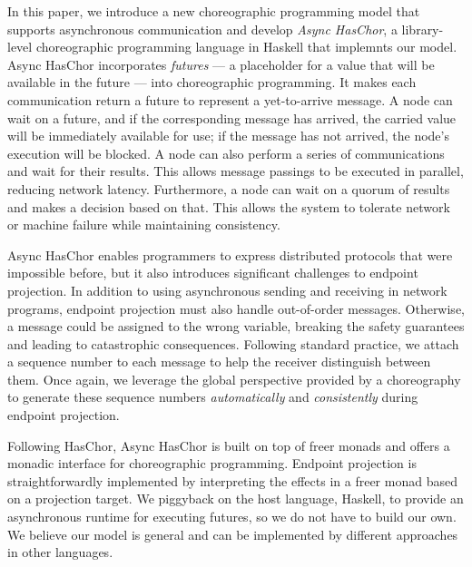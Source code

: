 In this paper, we introduce a new choreographic programming model that supports asynchronous communication and develop \emph{Async HasChor}, a library-level choreographic programming language in Haskell that implemnts our model.
%
Async HasChor incorporates \emph{futures} --- a placeholder for a value that will be available in the future --- into choreographic programming.
%
It makes each communication return a future to represent a yet-to-arrive message.
%
A node can wait on a future, and if the corresponding message has arrived, the carried value will be immediately available for use;
%
if the message has not arrived, the node's execution will be blocked.
%
A node can also perform a series of communications and wait for their results.
%
This allows message passings to be executed in parallel, reducing network latency.
%
Furthermore, a node can wait on a quorum of results and makes a decision based on that.
%
This allows the system to tolerate network or machine failure while maintaining consistency.

Async HasChor enables programmers to express distributed protocols that were impossible before, but it also introduces significant challenges to endpoint projection.
%
In addition to using asynchronous sending and receiving in network programs, endpoint projection must also handle out-of-order messages.
%
Otherwise, a message could be assigned to the wrong variable, breaking the safety guarantees and leading to catastrophic consequences.
%
Following standard practice, we attach a sequence number to each message to help the receiver distinguish between them.
%
Once again, we leverage the global perspective provided by a choreography to generate these sequence numbers \emph{automatically} and \emph{consistently} during endpoint projection.

Following HasChor, Async HasChor is built on top of freer monads and offers a monadic interface for choreographic programming.
%
Endpoint projection is straightforwardly implemented by interpreting the effects in a freer monad based on a projection target.
%
We piggyback on the host language, Haskell, to provide an asynchronous runtime for executing futures, so we do not have to build our own.
%
We believe our model is general and can be implemented by different approaches in other languages.

